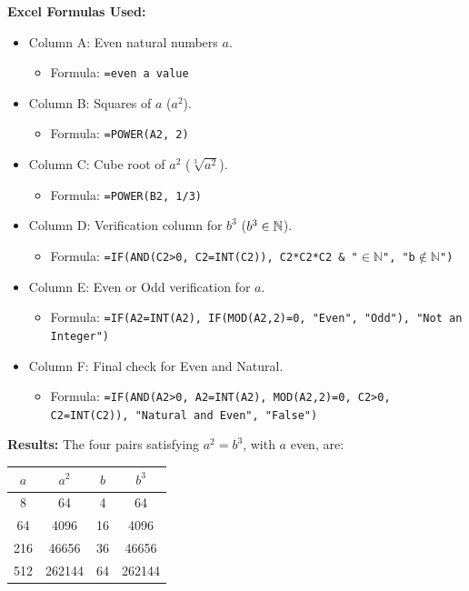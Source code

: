 \textbf{Excel Formulas Used:}
\begin{itemize}
    \item Column A: Even natural numbers \( a \).
        \begin{itemize}
            \item Formula: \texttt{=even a value}
        \end{itemize}
    \item Column B: Squares of \( a \) (\( a^2 \)).
        \begin{itemize}
            \item Formula: \texttt{=POWER(A2, 2)}
        \end{itemize}
    \item Column C: Cube root of \( a^2 \) (\( \sqrt[3]{a^2} \)).
        \begin{itemize}
            \item Formula: \texttt{=POWER(B2, 1/3)}
        \end{itemize}
    \item Column D: Verification column for \( b^3 \) (\( b^3 \in \mathbb{N} \)).
        \begin{itemize}
            \item Formula: \texttt{=IF(AND(C2>0, C2=INT(C2)), C2*C2*C2 \& "$\in\mathbb{N}$", "b$\notin\mathbb{N}$")}
        \end{itemize}
    \item Column E: Even or Odd verification for \( a \).
        \begin{itemize}
            \item Formula: \texttt{=IF(A2=INT(A2), IF(MOD(A2,2)=0, "Even", "Odd"), "Not an Integer")}
        \end{itemize}
    \item Column F: Final check for Even and Natural.
        \begin{itemize}
            \item Formula: \texttt{=IF(AND(A2>0, A2=INT(A2), MOD(A2,2)=0, C2>0, C2=INT(C2)), "Natural and Even", "False")}
        \end{itemize}
\end{itemize}

\textbf{Results:} The four pairs satisfying \( a^2 = b^3 \), with \( a \) even, are:
\begin{center}
    \begin{tabular}{|c|c|c|c|}
    \hline
    \( a \) & \( a^2 \) & \( b \) & \( b^3 \) \\
    \hline
    8 & 64 & 4 & 64 \\
    64 & 4096 & 16 & 4096 \\
    216 & 46656 & 36 & 46656 \\
    512 & 262144 & 64 & 262144 \\
    \hline
    \end{tabular}
\end{center}

